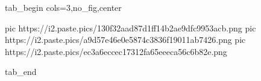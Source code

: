  
 
 
 
 


\ifcmt
  tab_begin cols=3,no_fig,center

     pic https://i2.paste.pics/130f32aad87d1ff14b2ae9dfc9953acb.png
		 pic https://i2.paste.pics/a9d57e46e0e5874c3836f19011ab7426.png
		 pic https://i2.paste.pics/ec3a6eccec17312fa65eeeca56c6b82e.png

  tab_end
\fi

